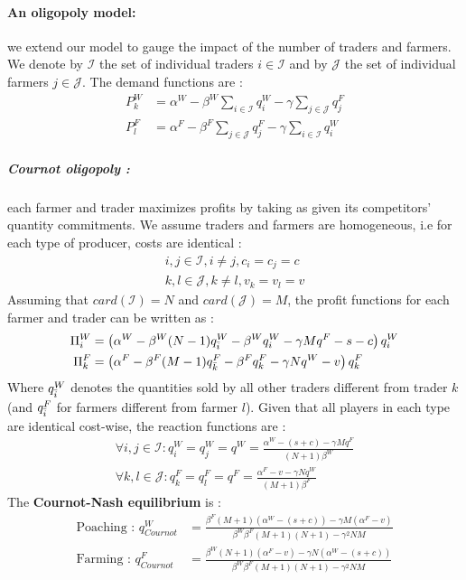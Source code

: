 \paragraph{An oligopoly model:}
we extend our model to gauge the impact of the number of traders and farmers. We denote by $\mathcal{I}$ the set of individual traders $i \in \mathcal{I}$ and by $\mathcal{J}$ the set of individual farmers $j \in \mathcal{J}$. The demand functions are : 
\begin{align}
    P_k^W &= \alpha^W - \beta^W \sum_{i \in \mathcal{I}}q^W_i - \gamma \sum_{j \in \mathcal{J}}q^F_j
    \\
    P_l^F &= \alpha^F - \beta^F \sum_{j \in \mathcal{J}}q^F_j - \gamma \sum_{i \in \mathcal{I}}q^W_i
\end{align}
\subparagraph{Cournot oligopoly : }
each farmer and trader maximizes profits by taking as given its competitors' quantity commitments. We assume traders and farmers are homogeneous, i.e for each type of producer, costs are identical : 
\begin{align*}
    i,j \in \mathcal{I}, i\neq j, c_i = c_j = c\\
    k,l \in \mathcal{J}, k\neq l, v_k = v_l = v
\end{align*}
Assuming that $card(\mathcal{I}) = N$ and $card(\mathcal{J})=M$, the profit functions for each farmer and trader can be written as : 
\begin{align}
    \Pi_i^W &= \left(\alpha^W - \beta^W (N-1)q^W_{\Bar{i}} - \beta^W q_i^W - \gamma Mq^F - s - c \right)q_i^W\\
    \Pi_k^F &= \left(\alpha^F - \beta^F (M-1)q^F_{\Bar{k}} - \beta^F q_k^F - \gamma Nq^W - v \right)q_k^F
\end{align}
Where $q^W_{\Bar{i}}$ denotes the quantities sold by all other traders different from trader $k$ (and $q^F_{\Bar{i}}$ for farmers different from farmer $l$). 
Given that all players in each type are identical cost-wise, the reaction functions are : 
\begin{align}
   \forall i,j \in \mathcal{I}: q^W_i = q^W_j = q^W = \frac{\alpha^W - (s+c) - \gamma M q^F}{(N+1)\beta^W}\\
    \forall k,l \in \mathcal{J} : q^F_k = q^F_l = q^F = \frac{\alpha^F - v - \gamma N q^W}{(M+1)\beta^F}
\end{align}
The \textbf{Cournot-Nash equilibrium} is :
\begin{align}
    \text{Poaching : }q^W_{Cournot} &= \frac{\beta^F (M+1)(\alpha^W - (s+c)) - \gamma M (\alpha^F-v)}{\beta^W \beta^F (M+1)(N+1) - \gamma^2 NM}\\
    \text{Farming : } q^F_{Cournot} &= \frac{\beta^W (N+1) (\alpha^F-v) - \gamma N (\alpha^W - (s+c))}{\beta^W \beta^F (M+1)(N+1) - \gamma^2 NM}\\
\end{align}

